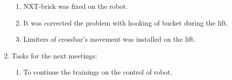 \begin{enumerate}
\begin{enumerate}
	  \item NXT-brick was fixed on the robot.
	  
      \item It was corrected the problem with hooking of bucket during the lift.
      
      \item Limiters of crossbar's movement was installed on the lift.
      
    \end{enumerate}
    
	\item Tasks for the next meetings:
	\begin{enumerate}
	  \item To continue the trainings on the control of robot.
	  
    \end{enumerate}     
\end{enumerate}
\fillpage